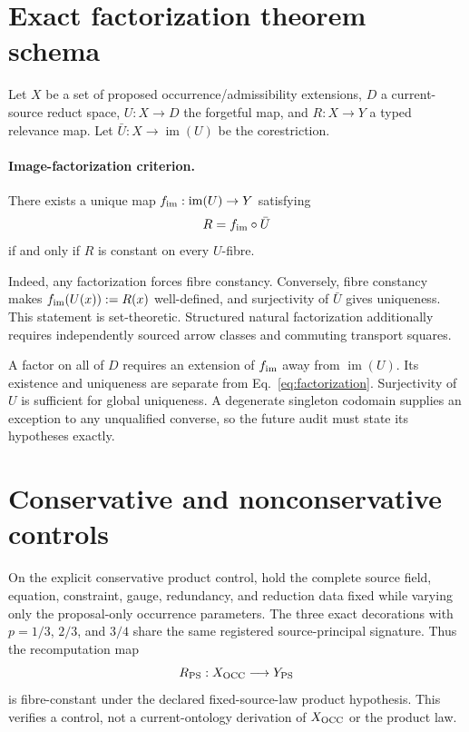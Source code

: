 \documentclass[11pt]{article}
\newcommand{\im}{\operatorname{im}}
\begin{document}
\section{Exact factorization theorem schema}

Let $X$ be a set of proposed occurrence/admissibility extensions, $D$ a
current-source reduct space, $U:X\to D$ the forgetful map, and $R:X\to Y$ a
typed relevance map. Let $\bar U:X\to\im(U)$ be the corestriction.

\paragraph{Image-factorization criterion.}
There exists a unique map $f_{\rm im}:\im(U)\to Y$ satisfying
\begin{equation}
  R=f_{\rm im}\circ\bar U
  \label{eq:factorization}
\end{equation}
if and only if $R$ is constant on every $U$-fibre.

Indeed, any factorization forces fibre constancy. Conversely, fibre constancy
makes $f_{\rm im}(U(x)):=R(x)$ well-defined, and surjectivity of $\bar U$
gives uniqueness. This statement is set-theoretic. Structured natural
factorization additionally requires independently sourced arrow classes and
commuting transport squares.

A factor on all of $D$ requires an extension of $f_{\rm im}$ away from
$\im(U)$. Its existence and uniqueness are separate from
Eq.~\eqref{eq:factorization}. Surjectivity of $U$ is sufficient for global
uniqueness. A degenerate singleton codomain supplies an exception to any
unqualified converse, so the future audit must state its hypotheses exactly.

\section{Conservative and nonconservative controls}

On the explicit conservative product control, hold the complete source field,
equation, constraint, gauge, redundancy, and reduction data fixed while
varying only the proposal-only occurrence parameters. The three exact
decorations with $p=1/3$, $2/3$, and $3/4$ share the same registered
source-principal signature. Thus the recomputation map
\begin{equation}
  R_{\rm PS}:X_{\rm OCC}\longrightarrow Y_{\rm PS}
\end{equation}
is fibre-constant under the declared fixed-source-law product hypothesis.
This verifies a control, not a current-ontology derivation of $X_{\rm OCC}$ or
the product law.
\end{document}
